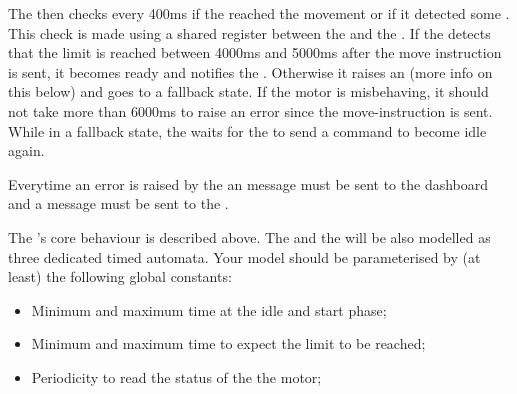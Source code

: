 \documentclass[11pt]{article}
\begin{document}
The  then checks every 400ms if the  reached the movement  or if it detected some . This check is made using a shared register between the  and the .
If the  detects that the limit is reached between 4000ms and 5000ms after the move instruction is sent, it becomes ready and notifies the . Otherwise it 
raises an  (more info on this below) and goes to a fallback state.
%
If the motor is misbehaving, it should not take more than 6000ms to raise an error since the move-instruction is sent.
While in a fallback state, the  waits for the  to send a  command to become idle again.


Everytime an error is raised by the 
an  message must be sent to the dashboard and
a  message must be sent to the .

The 's core behaviour is described above. The  and the  will be also modelled as three dedicated timed automata.
  Your model should be parameterised by (at least) the following global constants:
\begin{itemize}
  \item Minimum and maximum time at the idle and start phase;
  \item Minimum and maximum time to expect the limit to be reached;
  \item Periodicity to read the status of the the motor;
\end{itemize}
\end{document}
